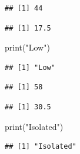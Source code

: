 \documentclass[
]{article}
\newenvironment{Shaded}{\begin{snugshade}}{\end{snugshade}}
\newcommand{\FunctionTok}[1]{\textcolor[rgb]{0.00,0.00,0.00}{#1}}
\newcommand{\NormalTok}[1]{#1}
\newcommand{\SpecialCharTok}[1]{\textcolor[rgb]{0.00,0.00,0.00}{#1}}
\newcommand{\StringTok}[1]{\textcolor[rgb]{0.31,0.60,0.02}{#1}}
\begin{document}
\begin{verbatim}
## [1] 44
\end{verbatim}

\begin{Shaded}
\end{Shaded}

\begin{verbatim}
## [1] 17.5
\end{verbatim}

\begin{Shaded}
\begin{Highlighting}[]
\FunctionTok{print}\NormalTok{(}\StringTok{"Low"}\NormalTok{)}
\end{Highlighting}
\end{Shaded}

\begin{verbatim}
## [1] "Low"
\end{verbatim}

\begin{Shaded}
\end{Shaded}

\begin{verbatim}
## [1] 58
\end{verbatim}

\begin{Shaded}
\end{Shaded}

\begin{verbatim}
## [1] 30.5
\end{verbatim}

\begin{Shaded}
\begin{Highlighting}[]
\FunctionTok{print}\NormalTok{(}\StringTok{"Isolated"}\NormalTok{)}
\end{Highlighting}
\end{Shaded}

\begin{verbatim}
## [1] "Isolated"
\end{verbatim}
\end{document}
